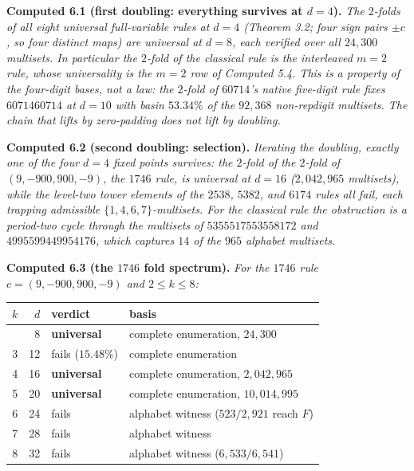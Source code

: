 \documentclass[11pt,letterpaper]{article}
\theoremstyle{paperstyle}
\theoremstyle{paperstyledef}
\theoremstyle{paperstylerem}
\begin{document}
\textbf{Computed 6.1 (first doubling: everything survives at \(d=4\)).} \emph{The \(2\)-folds of all eight universal full-variable rules at \(d = 4\) (Theorem 3.2; four sign pairs \(\pm c\), so four distinct maps) are universal at \(d = 8\), each verified over all \(24{,}300\) multisets. In particular the \(2\)-fold of the classical rule is the interleaved \(m=2\) rule, whose universality is the \(m = 2\) row of Computed 5.4. This is a property of the four-digit bases, not a law: the \(2\)-fold of \(60714\)'s native five-digit rule fixes \(6071460714\) at \(d = 10\) with basin \(53.34\%\) of the \(92{,}368\) non-repdigit multisets. The chain that lifts by zero-padding does not lift by doubling.}

\textbf{Computed 6.2 (second doubling: selection).} \emph{Iterating the doubling, exactly one of the four \(d=4\) fixed points survives: the \(2\)-fold of the \(2\)-fold of \((9,-900,900,-9)\), the \(1746\) rule, is universal at \(d = 16\) (\(2{,}042{,}965\) multisets), while the level-two tower elements of the \(2538\), \(5382\), and \(6174\) rules all fail, each trapping admissible \(\{1,4,6,7\}\)-multisets. For the classical rule the obstruction is a period-two cycle through the multisets of \(5355517553558172\) and \(4995599449954176\), which captures \(14\) of the \(965\) alphabet multisets.}

\textbf{Computed 6.3 (the \(1746\) fold spectrum).} \emph{For the \(1746\) rule \(c = (9, -900, 900, -9)\) and \(2 \leq k \leq 8\):}

{\def\LTcaptype{none} %
\begin{longtable}[]{@{}rrll@{}}
\toprule\noalign{}
\(k\) & \(d\) & verdict & basis \\
\midrule\noalign{}
\endhead
\bottomrule\noalign{}
\endlastfoot
2 & 8 & \textbf{universal} & complete enumeration, \(24{,}300\) \\
3 & 12 & fails (\(15.48\%\)) & complete enumeration \\
4 & 16 & \textbf{universal} & complete enumeration, \(2{,}042{,}965\) \\
5 & 20 & \textbf{universal} & complete enumeration, \(10{,}014{,}995\) \\
6 & 24 & fails & alphabet witness (\(523/2{,}921\) reach \(F\)) \\
7 & 28 & fails & alphabet witness \\
8 & 32 & fails & alphabet witness (\(6{,}533/6{,}541\)) \\
\end{longtable}
}
\end{document}
